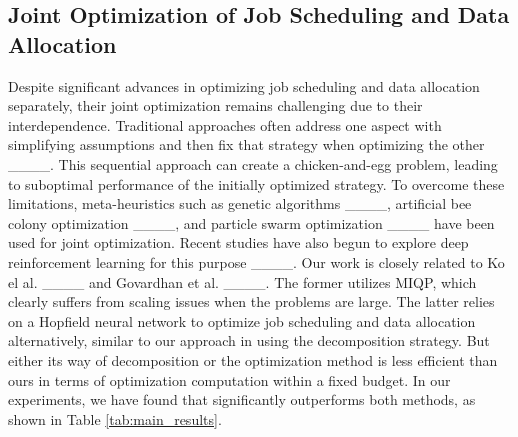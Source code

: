 \subsection{Joint Optimization of Job Scheduling and Data Allocation}
Despite significant advances in optimizing job scheduling and data allocation separately, their joint optimization remains challenging due to their interdependence. Traditional approaches often address one aspect with simplifying assumptions and then fix that strategy when optimizing the other ____. This sequential approach can create a chicken-and-egg problem, leading to suboptimal performance of the initially optimized strategy. To overcome these limitations, meta-heuristics such as genetic algorithms ____, artificial bee colony optimization ____, and particle swarm optimization ____ have been used for joint optimization. Recent studies have also begun to explore deep reinforcement learning for this purpose ____. Our work is closely related to Ko el al. ____ and Govardhan et al. ____. The former utilizes MIQP, 
which clearly suffers from scaling issues when the problems are large. The latter relies on a Hopfield neural network to optimize job scheduling and data allocation alternatively, similar to our approach in using the decomposition strategy. But either its way of decomposition or the optimization method is less efficient than ours in terms of optimization computation within a fixed budget.  In our experiments, we have found that \name{} significantly outperforms both methods, as shown in Table \ref{tab:main_results}.